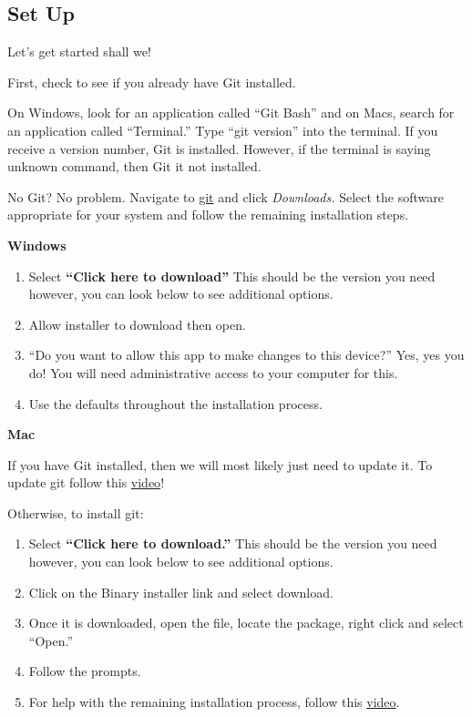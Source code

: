 \documentclass[
]{article}
\providecommand{\tightlist}{%
  \setlength{\itemsep}{0pt}\setlength{\parskip}{0pt}}
\begin{document}
\hypertarget{set-up}{%
\subsection{Set Up}\label{set-up}}

Let's get started shall we!

First, check to see if you already have Git installed.

On Windows, look for an application called ``Git Bash'' and on Macs,
search for an application called ``Terminal.'' Type ``git version'' into
the terminal. If you receive a version number, Git is installed.
However, if the terminal is saying unknown command, then Git it not
installed.

No Git? No problem. Navigate to \href{https://git-scm.com/}{git} and
click \emph{Downloads.} Select the software appropriate for your system
and follow the remaining installation steps.

\textbf{Windows}

\begin{enumerate}
\def\labelenumi{\arabic{enumi}.}
\tightlist
\item
  Select \textbf{``Click here to download''} This should be the version
  you need however, you can look below to see additional options.
\item
  Allow installer to download then open.
\item
  ``Do you want to allow this app to make changes to this device?'' Yes,
  yes you do! You will need administrative access to your computer for
  this.
\item
  Use the defaults throughout the installation process.
\end{enumerate}

\textbf{Mac}

If you have Git installed, then we will most likely just need to update
it. To update git follow this
\href{https://modulesunraveled.com/installing-git/updating-git-if-you-have-only-version-comes-xcode-or-command-line-developer-tools}{video}!

Otherwise, to install git:

\begin{enumerate}
\def\labelenumi{\arabic{enumi}.}
\tightlist
\item
  Select \textbf{``Click here to download.''} This should be the version
  you need however, you can look below to see additional options.
\item
  Click on the Binary installer link and select download.
\item
  Once it is downloaded, open the file, locate the package, right click
  and select ``Open.''
\item
  Follow the prompts.
\item
  For help with the remaining installation process, follow this
  \href{https://modulesunraveled.com/installing-git/installing-git-if-you-do-not-have-xcode-or-command-line-developer-tools-installed}{video}.
\end{enumerate}
\end{document}
